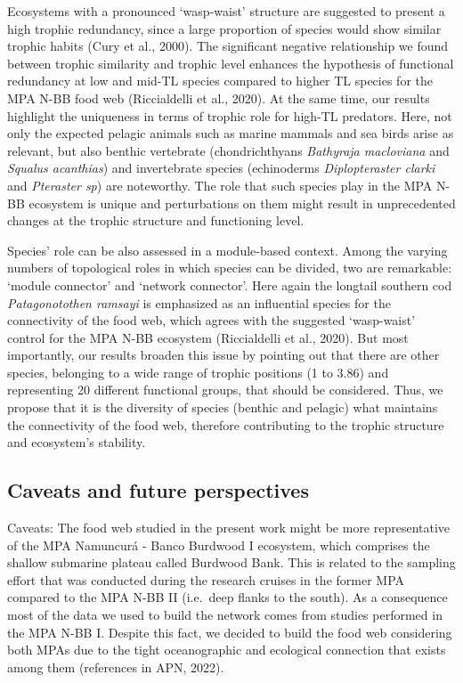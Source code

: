 \documentclass[preprint, 3p,
authoryear]{elsarticle} %
\begin{document}
Ecosystems with a pronounced `wasp-waist' structure are suggested to
present a high trophic redundancy, since a large proportion of species
would show similar trophic habits (Cury et al., 2000). The significant
negative relationship we found between trophic similarity and trophic
level enhances the hypothesis of functional redundancy at low and mid-TL
species compared to higher TL species for the MPA N-BB food web
(Riccialdelli et al., 2020). At the same time, our results highlight the
uniqueness in terms of trophic role for high-TL predators. Here, not
only the expected pelagic animals such as marine mammals and sea birds
arise as relevant, but also benthic vertebrate (chondrichthyans
\emph{Bathyraja macloviana} and \emph{Squalus acanthias}) and
invertebrate species (echinoderms \emph{Diplopteraster clarki} and
\emph{Pteraster sp}) are noteworthy. The role that such species play in
the MPA N-BB ecosystem is unique and perturbations on them might result
in unprecedented changes at the trophic structure and functioning level.

Species' role can be also assessed in a module-based context. Among the
varying numbers of topological roles in which species can be divided,
two are remarkable: `module connector' and `network connector'. Here
again the longtail southern cod \emph{Patagonotothen ramsayi} is
emphasized as an influential species for the connectivity of the food
web, which agrees with the suggested `wasp-waist' control for the MPA
N-BB ecosystem (Riccialdelli et al., 2020). But most importantly, our
results broaden this issue by pointing out that there are other species,
belonging to a wide range of trophic positions (1 to 3.86) and
representing 20 different functional groups, that should be considered.
Thus, we propose that it is the diversity of species (benthic and
pelagic) what maintains the connectivity of the food web, therefore
contributing to the trophic structure and ecosystem's stability.

\hypertarget{caveats-and-future-perspectives}{%
\subsection{Caveats and future
perspectives}\label{caveats-and-future-perspectives}}

Caveats: The food web studied in the present work might be more
representative of the MPA Namuncurá - Banco Burdwood I ecosystem, which
comprises the shallow submarine plateau called Burdwood Bank. This is
related to the sampling effort that was conducted during the research
cruises in the former MPA compared to the MPA N-BB II (i.e.~deep flanks
to the south). As a consequence most of the data we used to build the
network comes from studies performed in the MPA N-BB I. Despite this
fact, we decided to build the food web considering both MPAs due to the
tight oceanographic and ecological connection that exists among them
(references in APN, 2022).
\end{document}
